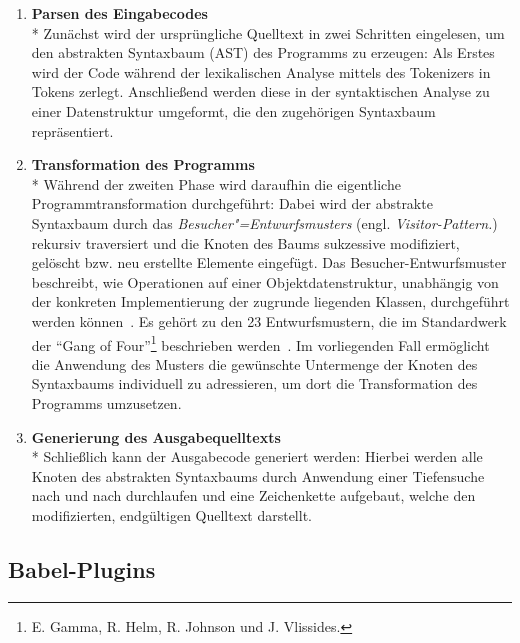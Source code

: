 \begin{enumerate}
  \item \textbf{Parsen des Eingabecodes}\\*
    Zunächst wird der ursprüngliche Quelltext in zwei Schritten eingelesen, um den abstrakten Syntaxbaum (AST) des Programms zu erzeugen: Als Erstes wird der Code während der lexikalischen Analyse mittels des Tokenizers in Tokens zerlegt. Anschließend werden diese in der syntaktischen Analyse zu einer Datenstruktur umgeformt, die den zugehörigen Syntaxbaum repräsentiert.
    \\

  \item \textbf{Transformation des Programms}\\*
    Während der zweiten Phase wird daraufhin die eigentliche Programmtransformation durchgeführt: Dabei wird der abstrakte Syntaxbaum durch das \textit{Besucher"=Entwurfsmusters} (engl. \textit{Visitor-Pattern.}) rekursiv traversiert und die Knoten des Baums sukzessive modifiziert, gelöscht bzw. neu erstellte Elemente eingefügt. Das Besucher-Entwurfsmuster beschreibt, wie Operationen auf einer Objektdatenstruktur, unabhängig von der konkreten Implementierung der zugrunde liegenden Klassen, durchgeführt werden können~\autocite[634\psq]{Freeman:2004}.
    Es gehört zu den 23 Entwurfsmustern, die im Standardwerk  der \enquote{Gang of Four}\footnote{E. Gamma, R. Helm, R. Johnson und J. Vlissides.} beschrieben werden~\autocite[306\psqq]{GAMMA:1994}. Im vorliegenden Fall ermöglicht die Anwendung des Musters die gewünschte Untermenge der Knoten des Syntaxbaums individuell zu adressieren, um dort die Transformation des Programms umzusetzen.
    \\

  \item \textbf{Generierung des Ausgabequelltexts}\\*
    Schließlich kann der Ausgabecode generiert werden: Hierbei werden alle Knoten des abstrakten Syntaxbaums durch Anwendung einer Tiefensuche nach und nach durchlaufen und eine Zeichenkette aufgebaut, welche den modifizierten, endgültigen Quelltext darstellt.
\end{enumerate}

\subsection{Babel-Plugins}
\label{subsection:babel-plugins}

